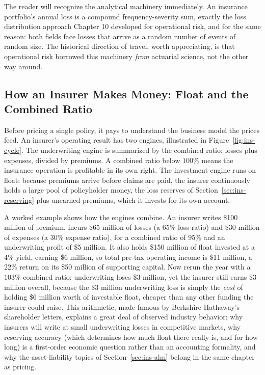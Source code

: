 \documentclass[../ai_in_finance]{subfiles}
\begin{document}
The reader will recognize the analytical machinery immediately. An insurance portfolio's annual loss is a compound frequency-severity sum, exactly the loss distribution approach Chapter 10 developed for operational risk, and for the same reason: both fields face losses that arrive as a random number of events of random size. The historical direction of travel, worth appreciating, is that operational risk borrowed this machinery \emph{from} actuarial science, not the other way around.

\subsection{How an Insurer Makes Money: Float and the Combined Ratio}
\label{sec:ins-economics}

Before pricing a single policy, it pays to understand the business model the prices feed. An insurer's operating result has two engines, illustrated in Figure~\ref{fig:ins-cycle}. The underwriting engine is summarized by the combined ratio: losses plus expenses, divided by premiums. A combined ratio below $100\%$ means the insurance operation is profitable in its own right. The investment engine runs on float: because premiums arrive before claims are paid, the insurer continuously holds a large pool of policyholder money, the loss reserves of Section~\ref{sec:ins-reserving} plus unearned premiums, which it invests for its own account.

A worked example shows how the engines combine. An insurer writes \$100 million of premium, incurs \$65 million of losses (a $65\%$ loss ratio) and \$30 million of expenses (a $30\%$ expense ratio), for a combined ratio of $95\%$ and an underwriting profit of \$5 million. It also holds \$150 million of float invested at a $4\%$ yield, earning \$6 million, so total pre-tax operating income is \$11 million, a $22\%$ return on its \$50 million of supporting capital. Now rerun the year with a $103\%$ combined ratio: underwriting loses \$3 million, yet the insurer still earns \$3 million overall, because the \$3 million underwriting loss is simply the \emph{cost} of holding \$6 million worth of investable float, cheaper than any other funding the insurer could raise. This arithmetic, made famous by Berkshire Hathaway's shareholder letters, explains a great deal of observed industry behavior: why insurers will write at small underwriting losses in competitive markets, why reserving accuracy (which determines how much float there really is, and for how long) is a first-order economic question rather than an accounting formality, and why the asset-liability topics of Section~\ref{sec:ins-alm} belong in the same chapter as pricing.
\end{document}

